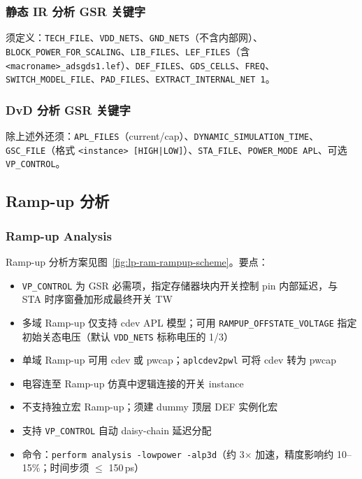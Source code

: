 
\subsubsection{静态 IR 分析 GSR 关键字}
须定义：\texttt{TECH\_FILE}、\texttt{VDD\_NETS}、\texttt{GND\_NETS}（不含内部网）、\texttt{BLOCK\_POWER\_FOR\_SCALING}、\texttt{LIB\_FILES}、\texttt{LEF\_FILES}（含 \texttt{<macroname>\_adsgds1.lef}）、\texttt{DEF\_FILES}、\texttt{GDS\_CELLS}、\texttt{FREQ}、\texttt{SWITCH\_MODEL\_FILE}、\texttt{PAD\_FILES}、\texttt{EXTRACT\_INTERNAL\_NET 1}。

\subsubsection{DvD 分析 GSR 关键字}
除上述外还须：\texttt{APL\_FILES}（current/cap）、\texttt{DYNAMIC\_SIMULATION\_TIME}、\texttt{GSC\_FILE}（格式 \texttt{<instance> [HIGH|LOW]}）、\texttt{STA\_FILE}、\texttt{POWER\_MODE APL}、可选 \texttt{VP\_CONTROL}。

\subsection{Ramp-up 分析}
\subsubsection*{Ramp-up Analysis}

Ramp-up 分析方案见图~\ref{fig:lp-ram-rampup-scheme}。要点：
\begin{itemize}
  \item \texttt{VP\_CONTROL} 为 GSR 必需项，指定存储器块内开关控制 pin 内部延迟，与 STA 时序窗叠加形成最终开关 TW
  \item 多域 Ramp-up 仅支持 cdev APL 模型；可用 \texttt{RAMPUP\_OFFSTATE\_VOLTAGE} 指定初始关态电压（默认 \texttt{VDD\_NETS} 标称电压的 1/3）
  \item 单域 Ramp-up 可用 cdev 或 pwcap；\texttt{aplcdev2pwl} 可将 cdev 转为 pwcap
  \item 电容连至 Ramp-up 仿真中逻辑连接的开关 instance
  \item 不支持独立宏 Ramp-up；须建 dummy 顶层 DEF 实例化宏
  \item 支持 \texttt{VP\_CONTROL} 自动 daisy-chain 延迟分配
  \item 命令：\texttt{perform analysis -lowpower -alp3d}（约 3$\times$ 加速，精度影响约 10--15\%；时间步须 $\le$ 150\,ps）
\end{itemize}

